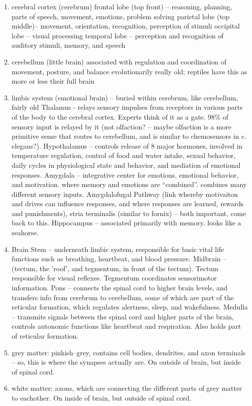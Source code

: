 \documentclass[11pt, a4paper, oneside]{article}   	%
\begin{document}
\begin{enumerate}
    \item cerebral cortex (cerebrum)
        \subitem frontal lobe (top front) -- reasoning, planning, parts of speech, movement, emotions, problem solving
        \subitem parietal lobe (top middle)-- movement,  orientation, recognition, perception of stimuli
        \subitem occipital lobe -- visual processing
        \subitem temporal lobe -- perception and recognition of auditory stimuli, memory, and speech
    \item cerebellum (little brain)
        \subitem associated with regulation and coordination of movement, posture, and balance
        \subitem evolutionarily really old; reptiles have this as more or less their full brain
    \item limbic system (emotional brain) -- buried within cerebrum, like cerebellum, fairly old
      \subitem Thalamus - relays sensory impulses from receptors in various parts of the body to the cerebral cortex. Experts think of it as a gate. 98\% of sensory input is relayed by it (not olfaction? -- maybe olfaction is a more primitive sense that routes to cerebellum, and is similar to chemosensors in c. elegans?).
      \subitem Hypothalamus  -- controls release of 8 major hormones, involved in temperature regulation, control of food and water intake,  sexual behavior,  daily cycles in physiological state and behavior, and mediation of emotional responses. 
      \subitem Amygdala -- integrative center for emotions, emotional behavior, and motivation.  where memory and emotions are ``combined''. combines many different sensory inputs.
        \subsubitem Amygdalofugal Pathway (link whereby motivaiton and drives can influence responses, and where responses are learned, rewards and punishments), stria terminalis (similar to fornix) -- both important, come back to this.
      \subitem Hippocampus -- associated primarily with memory. looks like a seahorse. 
    \item Brain Stem -- underneath limbic system, responsible for basic vital life functions such as breathing, heartbeat, and blood pressure.
        \subitem Midbrain -- (tectum, the 'roof', and tegmentum, in front of the tectum). Tectum responsible for visual reflexes. Tegmentum coordinates sensorimotor  information. 
        \subitem Pons -- connects the spinal cord to higher brain levels, and transfers info from cerebrum to cerebellum, some of which are part of the reticular formation, which  regulates alertness, sleep, and wakefulness.
        \subitem Medulla -- transmits signals between the spinal cord and higher parts of the brain, controls autonomic functions like heartbeat and respiration. Also holds part of reticular formation.
    \item grey matter: pinkish--grey, contains cell bodies, dendrites, and axon terminals -- so, this is where the synapses actually are. On outside of brain, but inside of spinal cord.
    \item white matter: axons, which are connecting the different parts of grey matter to eachother. On inside of brain, but outside of spinal cord.
\end{enumerate}
\end{document}
